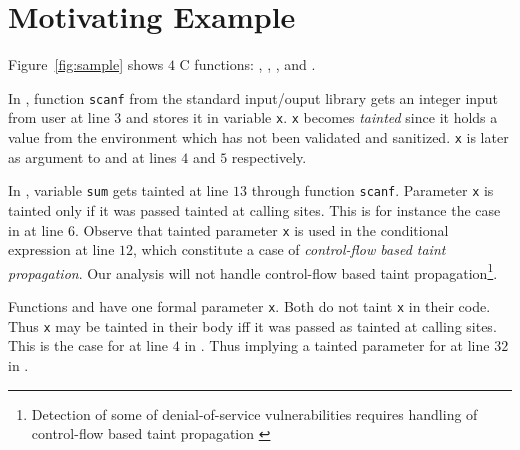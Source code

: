 \section{Motivating Example}\label{sec:example} 

\begin{figure*}[!ht]
\centering
{}
\caption{Motivating Example}
\label{fig:sample}
\end{figure*}

Figure~\ref{fig:sample} shows $4$ C functions:
\main, \even, \odd, and \compute.

In \main{}, function \texttt{scanf} from the standard input/ouput
library gets an integer input from user at line $3$
and stores it in variable \texttt{x}. \texttt{x} 
becomes \textit{tainted} since it holds a value from
the environment which has not been validated and
sanitized.
\texttt{x} is later as argument to \even{} and \odd{} at
lines $4$ and $5$ respectively.

In \compute{}, variable \texttt{sum} gets tainted at
line $13$ through function \texttt{scanf}. Parameter
\texttt{x} is tainted only if it was passed tainted
at calling sites.
This is for instance the case in \main{} at line $6$.
Observe that tainted parameter \texttt{x} is used in
the conditional expression at line $12$, which constitute
a case of \textit{control-flow based taint propagation}.
Our analysis will not handle control-flow based taint
propagation\footnote{Detection of some of denial-of-service
vulnerabilities requires handling of control-flow based
taint propagation \cite{Chang:2009:ICS}}. 

Functions \even{} and \odd{} have one formal parameter
\texttt{x}. Both do not taint \texttt{x} in their code.
Thus \texttt{x} may be tainted in their body iff it was
passed as tainted at calling sites. This is the case
for \even{} at line $4$ in \main{}. Thus implying a tainted
parameter for \odd{} at line $32$ in \even{}.